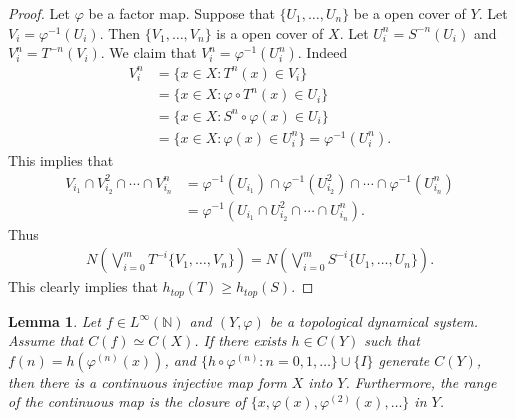 \documentclass[a4paper,10pt]{amsart}
\newtheorem{lemma}{Lemma}[section]
\newcommand{\N}{\mathbb N} %
\begin{document}
\begin{proof}
    Let $\varphi$ be a factor map.
    Suppose that $\{U_{1}, \ldots ,U_{n}\}$ be a open cover of $Y$. 
    Let $V_{i} = \varphi^{-1}(U_{i})$. Then $\{V_1, \ldots, V_{n}\}$ is
    a open cover of $X$. Let $U^{n}_{i} = S^{-n}(U_{i})$ and
    $V^{n}_{i} = T^{-n}(V_{i})$. We claim that 
    $V^{n}_{i} = \varphi^{-1}(U^{n}_{i})$. Indeed
    \begin{align*}
        V_{i}^{n} &= \{x \in X : T^{n}(x) \in V_{i}\}\\
                  &=\{x \in X : \varphi \circ T^{n}(x) \in U_{i}\}\\
                  &=\{x \in X : S^{n} \circ \varphi (x) \in U_{i}\}\\
                  &=\{x \in X : \varphi(x) \in U_{i}^{n} \} 
                  = \varphi^{-1}(U^{n}_{i}).
    \end{align*}
    This implies that
    \begin{align*}
        V_{i_1}\cap V_{i_2}^{2} \cap \cdots \cap V_{i_n}^{n}
        &= \varphi^{-1}(U_{i_1})\cap \varphi^{-1}(U_{i_2}^{2}) 
        \cap \cdots \cap \varphi^{-1}(U_{i_n}^{n})\\
        &=\varphi^{-1}(
        U_{i_1}\cap U_{i_2}^{2} \cap \cdots \cap U_{i_n}^{n}).
    \end{align*}
    Thus
    \begin{align*}
        N(\bigvee_{i=0}^{m}T^{-i}\{V_{1},\ldots, V_{n}\})
        = N(\bigvee_{i=0}^{m}S^{-i}\{U_{1},\ldots, U_{n}\}).
    \end{align*}
    This clearly implies that $h_{top}(T) \geq h_{top}(S)$.
\end{proof}


\begin{lemma} \label{w_lam4}
    Let $f \in L^{\infty}(\N)$ and $(Y, \varphi)$ be 
    a topological dynamical system.
    Assume that $C(f) \simeq C(X)$.
    If there exists $h \in C(Y)$ such that $f(n) = h(\varphi^{(n)}(x))$,
    and $\{h\circ \varphi^{(n)} : n = 0, 1, \ldots \} \cup \{I\}$ generate
    $C(Y)$, then there is a continuous injective map form $X$ into $Y$. 
    Furthermore, the range of the continuous map is the closure of 
    $\{x, \varphi(x), \varphi^{(2)}(x), \ldots \}$ in $Y$.
\end{lemma}
\end{document}
